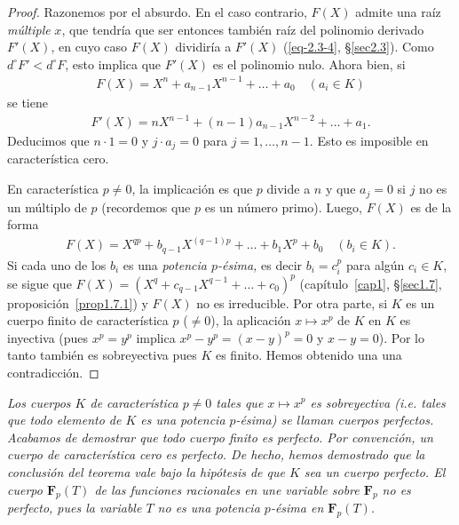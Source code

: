 \documentclass[10pt,oneside,bibtotoc,smallheadings,leqno,a5paper,DIV=12]{scrbook}
\newcommand{\FF}{\mathbf{F}}
\numberwithin{equation}{section}
\newenvironment{comm}%
	{\begin{trivlist}\item\small\itshape}
	{\end{trivlist}}
\theoremstyle{defi}
\theoremstyle{enonce}
\theoremstyle{rem}
\numberwithin{theorem}{section}
\numberwithin{proposition}{section}
\numberwithin{definition}{section}
\numberwithin{lemma}{section}
\numberwithin{corollary}{section}
\numberwithin{example}{section}
\numberwithin{footnote}{section}%
\begin{document}
\begin{proof}
Razonemos por el absurdo. En el caso contrario, $F(X)$ admite una ra\'iz \emph{m\'ultiple} $x$, que
tendr\'ia que ser entonces tambi\'en ra\'iz del polinomio derivado $F'(X)$, en cuyo caso $F(X)$
dividir\'ia a $F'(X)$ (\eqref{eq-2.3-4}, \S\ref{sec2.3}). Como $d^{\circ}F' < d^{\circ}F$, esto implica que $F'(X)$ es el
polinomio nulo. Ahora bien, si
\begin{gather*}
F(X) = X^{n}+a_{n-1}X^{n-1}+\dots+a_{0}\quad(a_{i}\in K)
\end{gather*}
se tiene
\begin{gather*}
F'(X) = nX^{n-1}+(n-1)a_{n-1}X^{n-2}+\dots+a_{1}.
\end{gather*}
Deducimos que $n\cdot 1 = 0$ y $j\cdot a_{j} = 0$ para $j=1,\dots,n-1$. Esto es imposible en caracter\'istica
cero.

En caracter\'istica $p\neq 0$, la implicaci\'on es que $p$ divide a $n$ y que $a_{j} = 0$ si $j$ no es
un m\'ultiplo de $p$ (recordemos que $p$ es un n\'umero primo). Luego, $F(X)$ es de la forma
\begin{gather*}
F(X) = X^{qp}+b_{q-1}X^{(q-1)p}+\dots+b_{1}X^{p}+b_{0}\quad(b_{i}\in K).
\end{gather*}
Si cada uno de los $b_{i}$ es una \emph{potencia $p$-\'esima,} es decir $b_{i} = c_{i}^{p}$ para
alg\'un $c_{i}\in K$, se sigue que $F(X) = (X^{q}+c_{q-1}X^{q-1}+\dots+c_{0})^{p}$ (cap\'itulo~\ref{cap1}, \S\ref{sec1.7},
proposici\'on~\ref{prop1.7.1}) y $F(X)$ no es irreducible. Por otra parte, si $K$ es un cuerpo finito de caracter\'istica $p$
($\neq 0$), la aplicaci\'on $x\mapsto x^{p}$ de $K$ en $K$ es inyectiva (pues
$x^{p}=y^{p}$ implica $x^{p}-y^{p} = (x-y)^{p} = 0$ y $x-y=0$). Por lo tanto tambi\'en es sobreyectiva
pues $K$ es finito. Hemos obtenido una una contradicci\'on.
\end{proof}

\begin{comm}
Los cuerpos $K$ de caracter\'istica $p\neq 0$ tales que $x\mapsto x^{p}$ es sobreyectiva
(i.e. tales que todo elemento de $K$ es una potencia $p$-\'esima) se llaman cuerpos \emph{perfectos.}
Acabamos de demostrar que todo cuerpo finito es perfecto. Por convenci\'on, un cuerpo de caracter\'istica
cero es perfecto. De hecho, hemos demostrado que la conclusi\'on del teorema vale bajo la hip\'otesis
de que $K$ sea un cuerpo perfecto. El cuerpo $\FF_{p}(T)$ de las funciones racionales en une variable
sobre $\FF_{p}$ no es perfecto, pues la variable $T$ no es una potencia $p$-\'esima en $\FF_{p}(T)$.
\end{comm}
\end{document}
